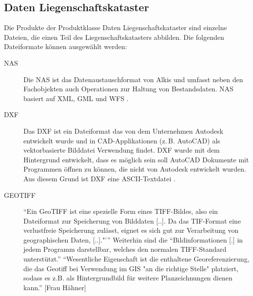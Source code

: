 \subsection{Daten Liegenschaftskataster}

Die Produkte der Produktklasse Daten Liegenschaftskataster sind einzelne Dateien, die einen Teil des Liegenschaftskatasters abbilden. Die folgenden Dateiformate können ausgewählt werden:
\begin{description}
\item[NAS] Die \ac{NAS} ist das Datenaustauschformat von Alkis und umfasst neben den Fachobjekten auch Operationen zur Haltung von Bestandsdaten. \ac{NAS} basiert auf \ac{XML}, \ac{GML} und \ac{WFS} \autocite[vgl.][]{sachsen-nas}.

\item[DXF] Das \ac{DXF} ist ein Dateiformat das von dem Unternehmen Autodesk entwickelt wurde und in \ac{CAD}-Applikationen (z.\,B. AutoCAD) als vektorbasierte Bilddatei Verwendung findet.
\ac{DXF} wurde mit dem Hintergrund entwickelt, dass es möglich sein soll AutoCAD Dokumente mit Programmen öffnen zu können, die nicht von Autodesk entwickelt wurden. Aus diesem Grund ist \ac{DXF} eine ASCII-Textdatei \autocite[vgl.][]{fileinfo-dxf}.

\item[GEOTIFF] \enquote{Ein GeoTIFF ist eine spezielle Form eines TIFF-Bildes, also ein Dateiformat zur Speicherung von Bilddaten [..]. Da das TIF-Format eine verlustfreie Speicherung zulässt, eignet es sich gut zur Verarbeitung von geographischen Daten, [..]."'} \autocite{wiki-geotiff} Weiterhin sind die \enquote{Bildinformationen [.] in jedem Programm darstellbar, welches den normalen TIFF-Standard unterstützt.}  \autocite{wiki-geotiff} \enquote{Wesentliche Eigenschaft ist die enthaltene Georeferenzierung, die das Geotiff bei Verwendung im GIS "an die richtige Stelle" platziert, sodass es z.B. als Hintergrundbild für weitere Planzeichnungen dienen kann.} [Frau Hähner] 
\end{description}

